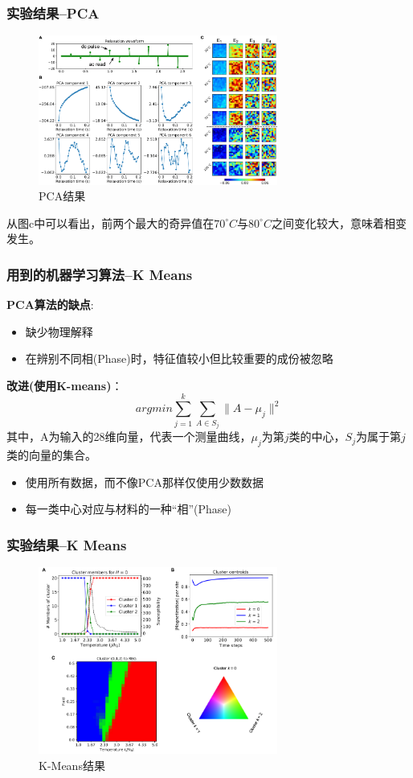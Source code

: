 \documentclass{beamer}
\begin{document}
\begin{frame}
\frametitle{实验结果--PCA}
\begin{figure}
\centering
\includegraphics[width=0.7\textwidth]{Materials/PCA1.png}
\caption{PCA结果}
\end{figure}
从图c中可以看出，前两个最大的奇异值在$70^{\circ}C$与$80^{\circ}C$之间变化较大，意味着相变发生。
\end{frame}

\begin{frame}
\frametitle{用到的机器学习算法--K Means}
\textbf{PCA算法的缺点}:
\begin{itemize}
\item 缺少物理解释
\item 在辨别不同相(Phase)时，特征值较小但比较重要的成份被忽略
\end{itemize}

\textbf{改进(使用K-means)}：
\begin{displaymath}
arg min \sum_{j=1}^{k}\sum_{A\in S_j}\parallel A - \mu_j \parallel^2
\end{displaymath}
其中，A为输入的28维向量，代表一个测量曲线，$\mu_j$为第$j$类的中心，$S_j$为属于第$j$类的向量的集合。
\begin{itemize}
\item 使用所有数据，而不像PCA那样仅使用少数数据
\item 每一类中心对应与材料的一种“相”(Phase)
\end{itemize}

\end{frame}

\begin{frame}
\frametitle{实验结果--K Means}
\begin{figure}
\centering
\includegraphics[width=0.7\textwidth]{Materials/KMeans.png}
\caption{K-Means结果}
\end{figure}

\end{frame}
\end{document}
